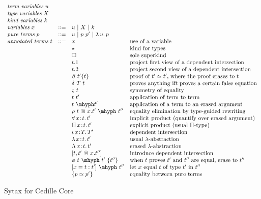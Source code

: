 \documentclass{article}
\newcommand{\abs}[4]{{#1}\, #2\! : \! #3.\, #4}
\newcommand{\absu}[3]{{#1}\, #2.\, #3}
\begin{document}
\begin{figure}
\[
\begin{array}{llll}
  \textit{term variables}\ u & \ & \ &\ \\
  \textit{type variables}\ X & \ & \ &\ \\
  \textit{kind variables}\ k & \ & \ &\ \\
  \textit{variables}\ x & ::= & u\ |\ X\ |\ k &\ \\  
  \textit{pure terms}\ p & ::= & u\ |\ p\ p'\ |\ \absu{\lambda}{u}{p} &\ \\
  \textit{annotated terms}\ t & ::= & x\ & \textnormal{use of a variable} \\
  \ &\ & \star&\textnormal{kind for types}\\
  \ &\ & \Box&\textnormal{sole superkind} \\
  \ &\ & t.1 & \textnormal{project first view of a dependent intersection}\\
  \ &\ & t.2 & \textnormal{project second view of a dependent intersection}\\
  \ &\ & \beta\ t'\{t\} &\textnormal{proof of }t' \simeq t'\textnormal{, where the proof erases to }t  \\
  \ &\ & \delta\ T\ t &\textnormal{proves anything if}t\textnormal{ proves a certain false equation}  \\
  \ &\ & \varsigma\ t &\textnormal{symmetry of equality}  \\
  \ &\ & t\ t' & \textnormal{application of term to term}\\
  \ &\ & t\ \mhyph t' & \textnormal{application of a term to an erased argument}\\
  \ &\ & \rho\ t\ @\ x.t'\ \mhyph\ t''&\textnormal{equality elimination by type-guided rewriting}  \\ 
  \ &\ & \abs{\forall}{x}{t}{t'}\ &\textnormal{implicit product (quantify over erased argument)} \\
  \ &\ & \abs{\Pi}{x}{t}{t'}\ &\textnormal{explicit product (usual }\Pi\textnormal{-type)} \\
  \ &\ & \abs{\iota}{x}{T}{T'}\ &\textnormal{dependent intersection} \\
  \ &\ & \abs{\lambda}{x}{t}{t'} & \textnormal{usual }\lambda\textnormal{-abstraction} \\
  \ &\ & \abs{\Lambda}{x}{t}{t'} & \textnormal{erased }\lambda\textnormal{-abstraction}\\
  \ &\ & [ t , t' \ @\ x.t'' ] & \textnormal{introduce dependent intersection}\\
  \ &\ & \phi\ t\ \mhyph\ t'\ \{t''\} & \textnormal{when }t\textnormal{ proves }t'\textnormal{ and }t''
                                   \textnormal{ are equal, erase to }t'' \\
  \ & \ & [ x = t : t' ]\ \mhyph\ t'' & \textnormal{let }x\textnormal{ equal }t\textnormal{ of type }t'\textnormal{ in }t'' \\
  \ &\ & \{ p \simeq p' \} &\textnormal{equality between pure terms}
\end{array}
  \]
  \caption{Sytax for Cedille Core}
  \label{fig:syntax}
\end{figure}
\end{document}
